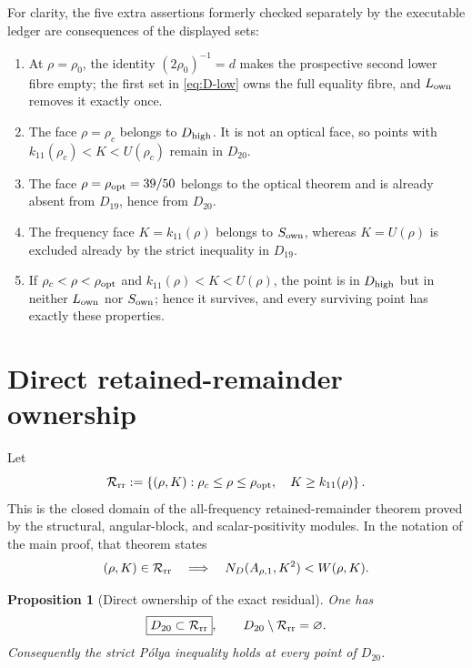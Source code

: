 \documentclass[11pt]{article}
\newtheorem{proposition}[lemma]{Proposition}
\begin{document}
For clarity, the five extra assertions formerly checked separately by
the executable ledger are consequences of the displayed sets:
\begin{enumerate}
\item At \(\rho=\rho_0\), the identity
      \((2\rho_0)^{-1}=d\) makes the prospective second lower fibre empty;
      the first set in \eqref{eq:D-low} owns the full equality fibre, and
      \(L_{\rm own}\) removes it exactly once.
\item The face \(\rho=\rho_c\) belongs to \(D_{\rm high}\). It is not an
      optical face, so points with
      \(k_{11}(\rho_c)<K<U(\rho_c)\) remain in \(D_{20}\).
\item The face \(\rho=\rho_{\rm opt}=39/50\) belongs to
      the optical theorem and is already absent from \(D_{19}\), hence
      from \(D_{20}\).
\item The frequency face \(K=k_{11}(\rho)\) belongs to
      \(S_{\rm own}\), whereas \(K=U(\rho)\) is excluded already by the
      strict inequality in \(D_{19}\).
\item If \(\rho_c<\rho<\rho_{\rm opt}\) and
      \(k_{11}(\rho)<K<U(\rho)\), the point is in \(D_{\rm high}\) but in
      neither \(L_{\rm own}\) nor \(S_{\rm own}\); hence it survives,
      and every surviving point has exactly these properties.
\end{enumerate}

\section{Direct retained-remainder ownership}

Let
\begin{equation}
 \mathcal R_{\rm rr}:=
 \left\{(\rho,K):
  \rho_c\leq\rho\leq\rho_{\rm opt},\quad
  K\geq k_{11}(\rho)\right\}.
 \label{eq:R-rr}
\end{equation}
This is the closed domain of the all-frequency retained-remainder theorem
proved by the structural, angular-block, and scalar-positivity modules.
In the notation of the main proof, that theorem states
\begin{equation}
 (\rho,K)\in\mathcal R_{\rm rr}
 \quad\Longrightarrow\quad
 N_D(A_{\rho,1},K^2)<W(\rho,K).
 \label{eq:all-K-rr}
\end{equation}

\begin{proposition}[Direct ownership of the exact residual]
\label{prop:direct-closure}
One has
\begin{equation}
 \boxed{D_{20}\subset\mathcal R_{\rm rr}},
 \qquad
 D_{20}\setminus\mathcal R_{\rm rr}=\varnothing.
 \label{eq:direct-closure}
\end{equation}
Consequently the strict P\'olya inequality holds at every point of
\(D_{20}\).
\end{proposition}
\end{document}
